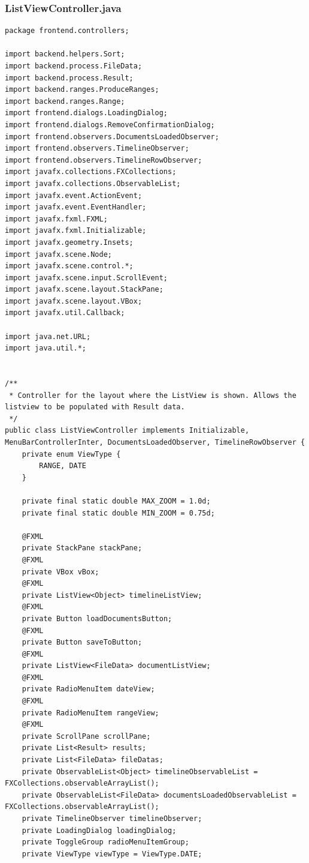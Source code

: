 \subsubsection{ListViewController.java}
\begin{lstlisting}
package frontend.controllers;

import backend.helpers.Sort;
import backend.process.FileData;
import backend.process.Result;
import backend.ranges.ProduceRanges;
import backend.ranges.Range;
import frontend.dialogs.LoadingDialog;
import frontend.dialogs.RemoveConfirmationDialog;
import frontend.observers.DocumentsLoadedObserver;
import frontend.observers.TimelineObserver;
import frontend.observers.TimelineRowObserver;
import javafx.collections.FXCollections;
import javafx.collections.ObservableList;
import javafx.event.ActionEvent;
import javafx.event.EventHandler;
import javafx.fxml.FXML;
import javafx.fxml.Initializable;
import javafx.geometry.Insets;
import javafx.scene.Node;
import javafx.scene.control.*;
import javafx.scene.input.ScrollEvent;
import javafx.scene.layout.StackPane;
import javafx.scene.layout.VBox;
import javafx.util.Callback;

import java.net.URL;
import java.util.*;


/**
 * Controller for the layout where the ListView is shown. Allows the listview to be populated with Result data.
 */
public class ListViewController implements Initializable, MenuBarControllerInter, DocumentsLoadedObserver, TimelineRowObserver {
    private enum ViewType {
        RANGE, DATE
    }

    private final static double MAX_ZOOM = 1.0d;
    private final static double MIN_ZOOM = 0.75d;

    @FXML
    private StackPane stackPane;
    @FXML
    private VBox vBox;
    @FXML
    private ListView<Object> timelineListView;
    @FXML
    private Button loadDocumentsButton;
    @FXML
    private Button saveToButton;
    @FXML
    private ListView<FileData> documentListView;
    @FXML
    private RadioMenuItem dateView;
    @FXML
    private RadioMenuItem rangeView;
    @FXML
    private ScrollPane scrollPane;
    private List<Result> results;
    private List<FileData> fileDatas;
    private ObservableList<Object> timelineObservableList = FXCollections.observableArrayList();
    private ObservableList<FileData> documentsLoadedObservableList = FXCollections.observableArrayList();
    private TimelineObserver timelineObserver;
    private LoadingDialog loadingDialog;
    private ToggleGroup radioMenuItemGroup;
    private ViewType viewType = ViewType.DATE;



\end{lstlisting}
